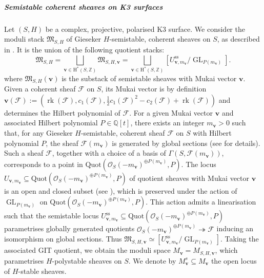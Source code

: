 \documentclass[11pt,english]{article}
\numberwithin{equation}{section}
\numberwithin{figure}{section}
\theoremstyle{definition}
\theoremstyle{plain}
\theoremstyle{remark}
\DeclareMathOperator{\GL}{GL}
\DeclareMathOperator{\rk}{rk}
\begin{document}
\subparagraph*{Semistable coherent sheaves on K3 surfaces}

Let $(S,H)$ be a complex, projective, polarised K3 surface. We consider
the moduli stack $\mathfrak{M}_{S,H}$ of Gieseker $H$-semistable,
coherent sheaves on $S$, as described in \cite{HL10}. It is the
union of the following quotient stacks:\[
\mathfrak{M}_{S,H}
=\bigsqcup_{\textbf{v}\in \mathrm{H}^*(S,\mathbb{Z})}\mathfrak{M}_{S,H,\textbf{v}}
=\bigsqcup_{\textbf{v}\in \mathrm{H}^*(S,\mathbb{Z})}[U_{\textbf{v},m_{\textbf{v}}}^{\mathrm{ss}}/\GL_{P(m_{\textbf{v}})}].
\]where $\mathfrak{M}_{S,H}(\textbf{v})$ is the substack of semistable
sheaves with Mukai vector $\textbf{v}$. Given a coherent sheaf $\mathcal{F}$
on $S$, its Mukai vector is by definition $\textbf{v}(\mathcal{F}):=(\rk(\mathcal{F}),c_{1}(\mathcal{F}),\frac{1}{2}c_{1}(\mathcal{F})^{2}-c_{2}(\mathcal{F})+\rk(\mathcal{F}))$
and determines the Hilbert polynomial of $\mathcal{F}$. For a given
Mukai vector $\textbf{v}$ and associated Hilbert polynomial $P\in\mathbb{Q}[t]$,
there exists an integer $m_{\textbf{v}}>0$ such that, for any Gieseker
$H$-semistable, coherent sheaf $\mathcal{F}$ on $S$ with Hilbert
polynomial $P$, the sheaf $\mathcal{F}(m_{\textbf{v}})$ is generated
by global sections (see \cite[\S4.3.]{HL10} for details). Such a
sheaf $\mathcal{F}$, together with a choice of a basis of $\Gamma(S,\mathcal{F}(m_{\textbf{v}}))$,
corresponds to a point in $\text{Quot}(\mathcal{O}_{S}(-m_{\textbf{v}})^{\oplus P(m_{\textbf{v}})},P)$.
The locus $U_{\textbf{v},m_{\textbf{v}}}\subseteq\text{Quot}(\mathcal{O}_{S}(-m_{\textbf{v}})^{\oplus P(m_{\textbf{v}})},P)$
of quotient sheaves with Mukai vector $\textbf{v}$ is an open and
closed subset (see \cite[Ch. 10.2.]{Huy16}), which is preserved under
the action of $\GL_{P(m_{\textbf{v}})}$ on $\text{Quot}(\mathcal{O}_{S}(-m_{\textbf{v}})^{\oplus P(m_{\textbf{v}})},P)$.
This action admits a linearisation such that the semistable locus
$U_{\textbf{v},m_{\textbf{v}}}^{\mathrm{ss}}\subseteq\text{Quot}(\mathcal{O}_{S}(-m_{\textbf{v}})^{\oplus P(m_{\textbf{v}})},P)$
parametrises globally generated quotients $\mathcal{O}_{S}(-m_{\textbf{v}})^{\oplus P(m_{\textbf{v}})}\twoheadrightarrow\mathcal{F}$
inducing an isomorphism on global sections. Thus $\mathfrak{M}_{S,H,\textbf{v}}\simeq[U_{\textbf{v},m_{\textbf{v}}}^{\mathrm{ss}}/\GL_{P(m_{\textbf{v}})}]$.
Taking the associated GIT quotient, we obtain the moduli space $M_{\textbf{v}}=M_{S,H,\textbf{v}}$,
which parametrises $H$-polystable sheaves on $S$. We denote by $M_{\textbf{v}}^{s}\subseteq M_{\textbf{v}}$
the open locus of $H$-stable sheaves.
\end{document}
